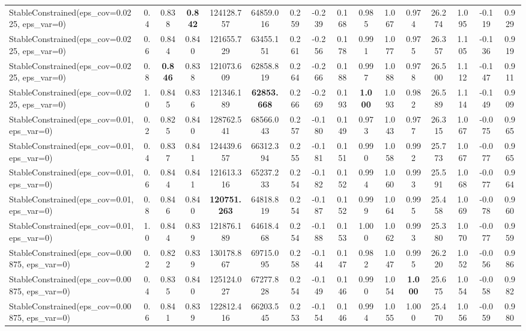 \documentclass[11pt]{article}
\theoremstyle{plain}
\theoremstyle{definition}
\newcommand{\1}{\mathbf{1}}
\begin{document}
\begin{table}[!h]
{\begin{tabular}{lccccccccccccccc}
StableConstrained(eps\_cov=0.0225, eps\_var=0) & 0.4 & 0.838 & \textbf{0.842} & 124128.757 & 64859.016 & 0.259 & -0.239 & 0.168 & 0.985 & 1.067 & 0.974 & 26.274 & 1.095 & -0.119 & 0.929 \\
StableConstrained(eps\_cov=0.0225, eps\_var=0) & 0.6 & 0.844 & 0.840 & 121655.729 & 63455.151 & 0.261 & -0.256 & 0.178 & 0.991 & 1.077 & 0.975 & 26.357 & 1.105 & -0.136 & 0.919 \\
StableConstrained(eps\_cov=0.0225, eps\_var=0) & 0.8 & \textbf{0.846} & 0.838 & 121073.609 & 62858.819 & 0.264 & -0.266 & 0.188 & 0.997 & 1.088 & 0.978 & 26.500 & 1.112 & -0.147 & 0.911 \\
StableConstrained(eps\_cov=0.0225, eps\_var=0) & 1.0 & 0.845 & 0.836 & 121346.189 & \textbf{62853.668} & 0.266 & -0.269 & 0.193 & \textbf{1.000} & 1.093 & 0.982 & 26.589 & 1.114 & -0.149 & 0.909 \\
StableConstrained(eps\_cov=0.01, eps\_var=0) & 0.2 & 0.825 & 0.840 & 128762.541 & 68566.043 & 0.257 & -0.180 & 0.149 & 0.973 & 1.043 & 0.977 & 26.315 & 1.067 & -0.075 & 0.965 \\
StableConstrained(eps\_cov=0.01, eps\_var=0) & 0.4 & 0.837 & 0.841 & 124439.657 & 66312.394 & 0.255 & -0.181 & 0.151 & 0.990 & 1.058 & 0.992 & 25.773 & 1.067 & -0.077 & 0.965 \\
StableConstrained(eps\_cov=0.01, eps\_var=0) & 0.6 & 0.844 & 0.841 & 121613.316 & 65237.233 & 0.254 & -0.182 & 0.152 & 0.994 & 1.060 & 0.993 & 25.591 & 1.068 & -0.077 & 0.964 \\
StableConstrained(eps\_cov=0.01, eps\_var=0) & 0.8 & 0.846 & 0.840 & \textbf{120751.263} & 64818.819 & 0.254 & -0.187 & 0.152 & 0.999 & 1.064 & 0.995 & 25.458 & 1.069 & -0.078 & 0.960 \\
StableConstrained(eps\_cov=0.01, eps\_var=0) & 1.0 & 0.844 & 0.839 & 121876.189 & 64618.468 & 0.254 & -0.188 & 0.153 & 1.000 & 1.062 & 0.993 & 25.380 & 1.070 & -0.077 & 0.959 \\
StableConstrained(eps\_cov=0.00875, eps\_var=0) & 0.2 & 0.822 & 0.839 & 130178.867 & 69715.095 & 0.258 & -0.144 & 0.147 & 0.982 & 1.047 & 0.995 & 26.220 & 1.052 & -0.056 & 0.986 \\
StableConstrained(eps\_cov=0.00875, eps\_var=0) & 0.4 & 0.835 & 0.840 & 125124.027 & 67277.828 & 0.254 & -0.149 & 0.146 & 0.990 & 1.054 & \textbf{1.000} & 25.675 & 1.054 & -0.058 & 0.982 \\
StableConstrained(eps\_cov=0.00875, eps\_var=0) & 0.6 & 0.841 & 0.839 & 122812.416 & 66203.545 & 0.253 & -0.154 & 0.146 & 0.994 & 1.055 & 1.000 & 25.470 & 1.056 & -0.059 & 0.980 \\

\end{tabular}}
\end{table}
\end{document}
